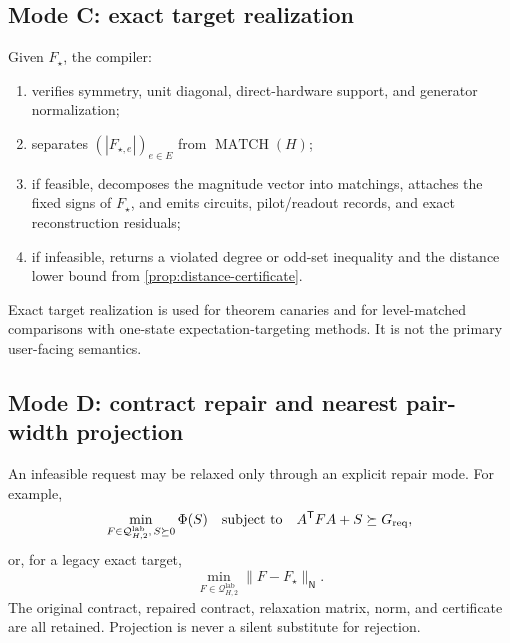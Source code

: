 \documentclass[11pt]{article}
\theoremstyle{definition}
\theoremstyle{remark}
\newcommand{\Q}{\mathcal{Q}}
\newcommand{\MATCH}{\operatorname{MATCH}}
\newcommand{\lab}{\mathrm{lab}}
\begin{document}
\subsection{Mode C: exact target realization}
Given $F_\star$, the compiler:
\begin{enumerate}[label=\textbf{C\arabic*.}]
  \item verifies symmetry, unit diagonal, direct-hardware support, and generator normalization;
  \item separates $(|F_{\star,e}|)_{e\in E}$ from $\MATCH(H)$;
  \item if feasible, decomposes the magnitude vector into matchings, attaches the fixed signs of $F_\star$, and emits circuits, pilot/readout records, and exact reconstruction residuals;
  \item if infeasible, returns a violated degree or odd-set inequality and the distance lower bound from \cref{prop:distance-certificate}.
\end{enumerate}
Exact target realization is used for theorem canaries and for level-matched comparisons with one-state expectation-targeting methods. It is not the primary user-facing semantics.

\subsection{Mode D: contract repair and nearest pair-width projection}
An infeasible request may be relaxed only through an explicit repair mode. For example,
\begin{equation}
  \min_{F\in\Q^{\lab}_{H,2},\,S\succeq0}
  \Phi(S)
  \quad\text{subject to}\quad
  A^{\mathsf T}FA+S\succeq G_{\rm req},
  \label{eq:floor-repair}
\end{equation}
or, for a legacy exact target,
\begin{equation}
  \min_{F\in\Q^{\lab}_{H,2}}\|F-F_\star\|_{\mathsf N}.
  \label{eq:projection-problem}
\end{equation}
The original contract, repaired contract, relaxation matrix, norm, and certificate are all retained. Projection is never a silent substitute for rejection.
\end{document}
